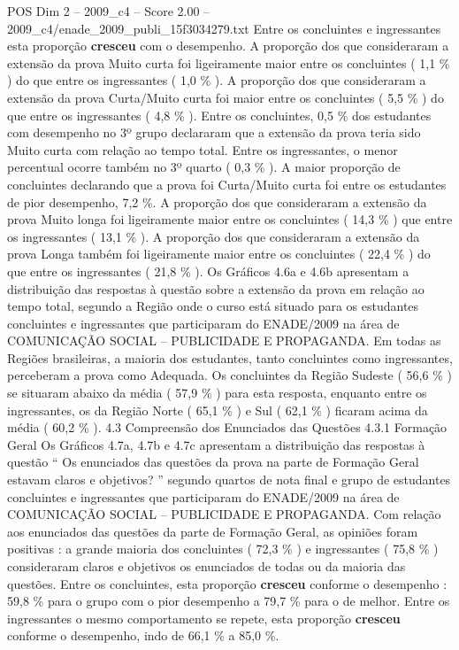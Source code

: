 \begin{textsample}{POS Dim 2 – 2009\_c4 – Score 2.00 – 2009\_c4/enade\_2009\_publi\_15f3034279.txt}
Entre os concluintes e ingressantes esta proporção \textbf{cresceu} com o desempenho.
A proporção dos que consideraram a extensão da prova Muito curta foi ligeiramente maior entre os concluintes ( 1,1 \% ) do que entre os ingressantes ( 1,0 \% ).
A proporção dos que consideraram a extensão da prova Curta/Muito curta foi maior entre os concluintes ( 5,5 \% ) do que entre os ingressantes ( 4,8 \% ).
Entre os concluintes, 0,5 \% dos estudantes com desempenho no 3º grupo declararam que a extensão da prova teria sido Muito curta com relação ao tempo total.
Entre os ingressantes, o menor percentual ocorre também no 3º quarto ( 0,3 \% ).
A maior proporção de concluintes declarando que a prova foi Curta/Muito curta foi entre os estudantes de pior desempenho, 7,2 \%.
A proporção dos que consideraram a extensão da prova Muito longa foi ligeiramente maior entre os concluintes ( 14,3 \% ) que entre os ingressantes ( 13,1 \% ).
A proporção dos que consideraram a extensão da prova Longa também foi ligeiramente maior entre os concluintes ( 22,4 \% ) do que entre os ingressantes ( 21,8 \% ).
Os Gráficos 4.6a e 4.6b apresentam a distribuição das respostas à questão sobre a extensão da prova em relação ao tempo total, segundo a Região onde o curso está situado para os estudantes concluintes e ingressantes que participaram do ENADE/2009 na área de COMUNICAÇÃO SOCIAL – PUBLICIDADE E PROPAGANDA.
Em todas as Regiões brasileiras, a maioria dos estudantes, tanto concluintes como ingressantes, perceberam a prova como Adequada.
Os concluintes da Região Sudeste ( 56,6 \% ) se situaram abaixo da média ( 57,9 \% ) para esta resposta, enquanto entre os ingressantes, os da Região Norte ( 65,1 \% ) e Sul ( 62,1 \% ) ficaram acima da média ( 60,2 \% ). 4.3 Compreensão dos Enunciados das Questões 4.3.1 Formação Geral Os Gráficos 4.7a, 4.7b e 4.7c apresentam a distribuição das respostas à questão “ Os enunciados das questões da prova na parte de Formação Geral estavam claros e objetivos? ” segundo quartos de nota final e grupo de estudantes concluintes e ingressantes que participaram do ENADE/2009 na área de COMUNICAÇÃO SOCIAL – PUBLICIDADE E PROPAGANDA.
Com relação aos enunciados das questões da parte de Formação Geral, as opiniões foram positivas : a grande maioria dos concluintes ( 72,3 \% ) e ingressantes ( 75,8 \% ) consideraram claros e objetivos os enunciados de todas ou da maioria das questões.
Entre os concluintes, esta proporção \textbf{cresceu} conforme o desempenho : 59,8 \% para o grupo com o pior desempenho a 79,7 \% para o de melhor.
Entre os ingressantes o mesmo comportamento se repete, esta proporção \textbf{cresceu} conforme o desempenho, indo de 66,1 \% a 85,0 \%.

\end{textsample}
